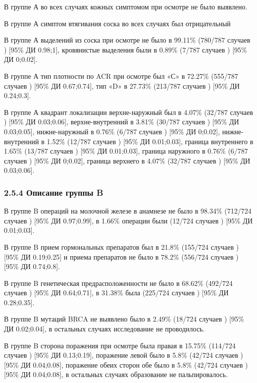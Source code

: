 \documentclass[
]{article}
\begin{document}
В группе А во всех случаях кожных симптомом при осмотре не было
выявлено.

В группе А симптом втягивания соска во всех случаях был отрицательный

В группе А выделений из соска при осмотре не было в 99.11\% (780/787
случаев ) {[}95\% ДИ 0.98;1{]}, кровянистые выделения были в 0.89\%
(7/787 случаев ) {[}95\% ДИ 0;0.02{]}.

В группе А тип плотности по ACR при осмотре был «С» в 72.27\% (555/787
случаев ) {[}95\% ДИ 0.67;0.74{]}, тип «D» в 27.73\% (213/787 случаев )
{[}95\% ДИ 0.24;0.3{]}.

В группе А квадрант локализации верхне-наружный был в 4.07\% (32/787
случаев ) {[}95\% ДИ 0.03;0.06{]}, верхне-внутренний в 3.81\% (30/787
случаев ) {[}95\% ДИ 0.03;0.05{]}, нижне-наружный в 0.76\% (6/787
случаев ) {[}95\% ДИ 0;0.02{]}, нижне-внутренний в 1.52\% (12/787
случаев ) {[}95\% ДИ 0.01;0.03{]}, граница внутреннего в 1.65\% (13/787
случаев ) {[}95\% ДИ 0.01;0.03{]}, граница наружного в 0.76\% (6/787
случаев ) {[}95\% ДИ 0;0.02{]}, граница верхнего в 4.07\% (32/787
случаев ) {[}95\% ДИ 0.03;0.06{]}.

\hypertarget{ux43eux43fux438ux441ux430ux43dux438ux435-ux433ux440ux443ux43fux43fux44b-b}{%
\subsubsection{2.5.4 Описание группы
B}\label{ux43eux43fux438ux441ux430ux43dux438ux435-ux433ux440ux443ux43fux43fux44b-b}}

В группе B операций на молочной железе в анамнезе не было в 98.34\%
(712/724 случаев ) {[}95\% ДИ 0.97;0.99{]}, в 1.66\% операции были
(12/724 случаев ) {[}95\% ДИ 0.01;0.03{]}.

В группе B прием гормональных препаратов был в 21.8\% (155/724 случаев )
{[}95\% ДИ 0.19;0.25{]} и приема препаратов не было в 78.2\% (556/724
случаев ) {[}95\% ДИ 0.74;0.8{]}.

В группе B генетическая предрасположенности не было в 68.62\% (492/724
случаев ) {[}95\% ДИ 0.64;0.71{]}, в 31.38\% была (225/724 случаев )
{[}95\% ДИ 0.28;0.35{]}.

В группе B мутаций BRCA не выявлено было в 2.49\% (18/724 случаев )
{[}95\% ДИ 0.02;0.04{]}, в остальных случаях исследование не
проводилось.

В группе B сторона поражения при осмотре была правая в 15.75\% (114/724
случаев ) {[}95\% ДИ 0.13;0.19{]}, поражение левой было в 5.8\% (42/724
случаев ) {[}95\% ДИ 0.04;0.08{]}, поражение обеих сторон обе было в
5.8\% (42/724 случаев ) {[}95\% ДИ 0.04;0.08{]}, в остальных случаях
образование не пальпировалось.
\end{document}
